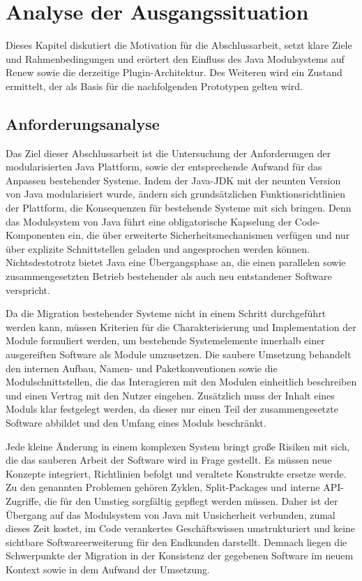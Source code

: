 \chapter{Analyse der Ausgangssituation}\label{cha:ausgangssituation}
	Dieses Kapitel diskutiert die Motivation für die Abschlussarbeit, setzt klare Ziele und Rahmenbedingungen und erörtert den Einfluss des Java Modulsystems auf Renew sowie die derzeitige Plugin-Architektur. Des Weiteren wird ein Zustand ermittelt, der als Basis für die nachfolgenden Prototypen gelten wird.

\section{Anforderungsanalyse} 
	Das Ziel dieser Abschlussarbeit ist die Untersuchung der Anforderungen der modularisierten Java Plattform, sowie der entsprechende Aufwand für das Anpassen bestehender Systeme. \bigbreak
	Indem der Java-JDK mit der neunten Version von Java modularisiert wurde, ändern sich grundsätzlichen Funktionsrichtlinien der Plattform, die Konsequenzen für bestehende Systeme mit sich bringen. Denn das Modulsystem von Java führt eine obligatorische Kapselung der Code-Komponenten ein, die über erweiterte Sicherheitsmechanismen verfügen und nur über explizite Schnittstellen geladen und angesprochen werden können.\newline 
	Nichtsdestotrotz bietet Java eine Übergangsphase an, die einen parallelen sowie zusammengesetzten Betrieb bestehender als auch neu entstandener Software verspricht.\bigbreak

	Da die Migration bestehender Systeme nicht in einem Schritt durchgeführt werden kann, müssen Kriterien für die Charakterisierung und Implementation der Module formuliert werden, um bestehende Systemelemente innerhalb einer ausgereiften Software als Module umzusetzen. Die saubere Umsetzung behandelt den internen Aufbau, Namen- und Paketkonventionen sowie die Modulschnittstellen, die das Interagieren mit den Modulen einheitlich beschreiben und einen Vertrag mit den Nutzer eingehen. Zusätzlich muss der Inhalt eines Moduls klar festgelegt werden, da dieser nur einen Teil der zusammengesetzte Software abbildet und den Umfang eines Moduls beschränkt.  \bigbreak 

	Jede kleine Änderung in einem komplexen System bringt große Risiken mit sich, die das sauberen Arbeit der Software wird in Frage gestellt. Es müssen neue Konzepte integriert, Richtlinien befolgt und veraltete Konstrukte ersetze werde. Zu den genannten Problemen gehören Zyklen, Split-Packages und interne API-Zugriffe, die für den Umstieg sorgfältig gepflegt werden müssen. Daher ist der Übergang auf das Modulsystem von Java mit Unsicherheit verbunden, zumal dieses Zeit kostet, im Code verankertes Geschäftswissen umstrukturiert und keine sichtbare Softwareerweiterung für den Endkunden darstellt. \newline
	Demnach liegen die Schwerpunkte der Migration in der Konsistenz der gegebenen Software im neuem Kontext sowie in dem Aufwand der Umsetzung. 
	\bigbreak

